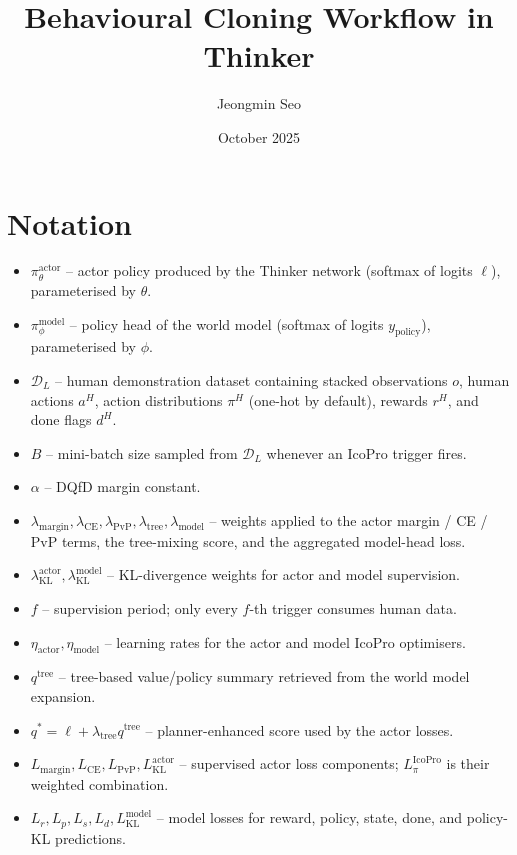 \documentclass{article}
\title{Behavioural Cloning Workflow in Thinker}
\author{Jeongmin Seo}
\date{October 2025}
\begin{document}
\maketitle

\section{Notation}
\begin{itemize}
  \item $\pi_{\theta}^{\mathrm{actor}}$ – actor policy produced by the Thinker network (softmax of logits $\ell$), parameterised by $\theta$.
  \item $\pi_{\phi}^{\mathrm{model}}$ – policy head of the world model (softmax of logits $y_{\mathrm{policy}}$), parameterised by $\phi$.
  \item $\mathcal{D}_L$ – human demonstration dataset containing stacked observations $o$, human actions $a^{H}$, action distributions $\pi^{H}$ (one-hot by default), rewards $r^{H}$, and done flags $d^{H}$.
  \item $B$ – mini-batch size sampled from $\mathcal{D}_L$ whenever an IcoPro trigger fires.
  \item $\alpha$ – DQfD margin constant.
  \item $\lambda_{\mathrm{margin}}, \lambda_{\mathrm{CE}}, \lambda_{\mathrm{PvP}}, \lambda_{\mathrm{tree}}, \lambda_{\mathrm{model}}$ – weights applied to the actor margin / CE / PvP terms, the tree-mixing score, and the aggregated model-head loss.
  \item $\lambda_{\mathrm{KL}}^{\mathrm{actor}}, \lambda_{\mathrm{KL}}^{\mathrm{model}}$ – KL-divergence weights for actor and model supervision.
  \item $f$ – supervision period; only every $f$-th trigger consumes human data.
  \item $\eta_{\mathrm{actor}}, \eta_{\mathrm{model}}$ – learning rates for the actor and model IcoPro optimisers.
  \item $q^{\text{tree}}$ – tree-based value/policy summary retrieved from the world model expansion.
  \item $q^{\ast} = \ell + \lambda_{\mathrm{tree}} q^{\text{tree}}$ – planner-enhanced score used by the actor losses.
  \item $L_{\mathrm{margin}}, L_{\mathrm{CE}}, L_{\mathrm{PvP}}, L_{\mathrm{KL}}^{\mathrm{actor}}$ – supervised actor loss components; $L_{\pi}^{\mathrm{IcoPro}}$ is their weighted combination.
  \item $L_{r}, L_{p}, L_{s}, L_{d}, L_{\mathrm{KL}}^{\mathrm{model}}$ – model losses for reward, policy, state, done, and policy-KL predictions.
\end{itemize}
\end{document}
